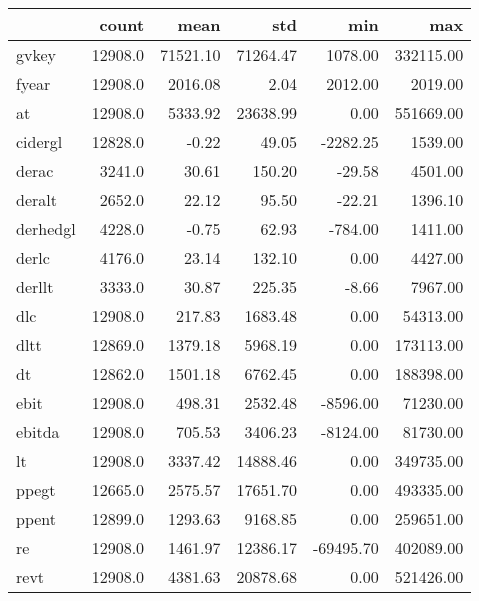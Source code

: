 \begin{tabular}{lrrrrr}
\toprule
{} &    count &      mean &       std &        min &         max \\
\midrule
gvkey                   &  12908.0 &  71521.10 &  71264.47 &    1078.00 &   332115.00 \\
fyear                   &  12908.0 &   2016.08 &      2.04 &    2012.00 &     2019.00 \\
at                      &  12908.0 &   5333.92 &  23638.99 &       0.00 &   551669.00 \\
cidergl                 &  12828.0 &     -0.22 &     49.05 &   -2282.25 &     1539.00 \\
derac                   &   3241.0 &     30.61 &    150.20 &     -29.58 &     4501.00 \\
deralt                  &   2652.0 &     22.12 &     95.50 &     -22.21 &     1396.10 \\
derhedgl                &   4228.0 &     -0.75 &     62.93 &    -784.00 &     1411.00 \\
derlc                   &   4176.0 &     23.14 &    132.10 &       0.00 &     4427.00 \\
derllt                  &   3333.0 &     30.87 &    225.35 &      -8.66 &     7967.00 \\
dlc                     &  12908.0 &    217.83 &   1683.48 &       0.00 &    54313.00 \\
dltt                    &  12869.0 &   1379.18 &   5968.19 &       0.00 &   173113.00 \\
dt                      &  12862.0 &   1501.18 &   6762.45 &       0.00 &   188398.00 \\
ebit                    &  12908.0 &    498.31 &   2532.48 &   -8596.00 &    71230.00 \\
ebitda                  &  12908.0 &    705.53 &   3406.23 &   -8124.00 &    81730.00 \\
lt                      &  12908.0 &   3337.42 &  14888.46 &       0.00 &   349735.00 \\
ppegt                   &  12665.0 &   2575.57 &  17651.70 &       0.00 &   493335.00 \\
ppent                   &  12899.0 &   1293.63 &   9168.85 &       0.00 &   259651.00 \\
re                      &  12908.0 &   1461.97 &  12386.17 &  -69495.70 &   402089.00 \\
revt                    &  12908.0 &   4381.63 &  20878.68 &       0.00 &   521426.00 \\

\end{tabular}
